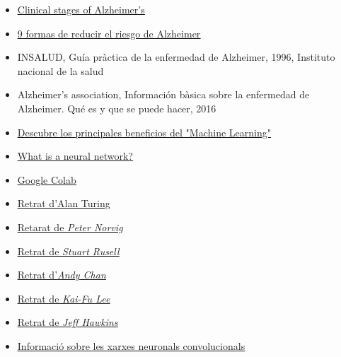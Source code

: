 \documentclass[a4paper,12pt]{article}
\begin{document}
\begin{itemize}
    \item \href{https://www.alzinfo.org/understand-alzheimers/clinical-stages-of-alzheimers/}{\underline{Clinical stages of Alzheimer's}}
    \item \href{https://www.ceafa.es/es/que-comunicamos/noticias/9-formas-de-reducir-el-riesgo-de-alzheimer}{\underline{9 formas de reducir el riesgo de Alzheimer}}
    \item INSALUD, Guía pràctica de la enfermedad de Alzheimer, 1996, Instituto nacional de la salud
    \item Alzheimer’s association, Información bàsica sobre la enfermedad de Alzheimer. Qué es y que se puede hacer, 2016
    \item \href{https://www.iberdrola.com/innovacion/machine-learning-aprendizaje-automatico}{\underline{Descubre los principales beneficios del "Machine Learning"}}
    \item \href{https://aws.amazon.com/es/what-is/neural-network/}{\underline{What is a neural network?}}
    \item \href{https://colab.research.google.com/}{\underline{Google Colab}}
    \item \href{https://upload.wikimedia.org/wikipedia/commons/a/a1/Alan_Turing_Aged_16.jpg}{\underline{Retrat d'Alan Turing}}
    \item \href{https://cs.berkeley.edu/sites/default/files/news_image/peter_norvig_speaking_at_university_of_california_berkeley_2013.jpg}{\underline{Retarat de \textit{Peter Norvig}}}
    \item \href{https://cs.berkeley.edu/sites/default/files/eecs_tout/russell-aqua.jpg}{\underline{Retrat de \textit{Stuart Rusell}}}
    \item \href{https://media.licdn.com/dms/image/C5603AQHgogiTxs2TZg/profile-displayphoto-shrink_800_800/0/1565701087600?e=2147483647&v=beta&t=p5ZjgearbT6mUGtGi2AEwDY07gaEWxmlGYDypO0HUVU}{\underline{Retrat d'\textit{Andy Chan}}}
    \item \href{https://upload.wikimedia.org/wikipedia/commons/0/0d/Capture_medium.jpg}{\underline{Retrat de \textit{Kai-Fu Lee}}}
    \item \href{https://m.media-amazon.com/images/W/IMAGERENDERING_521856-T1/images/S/amzn-author-media-prod/b2a43a485uokuohjp5l7peo9f0.jpg}{\underline{Retrat de \textit{Jeff Hawkins}}}
    \item \href{https://keepcoding.io/blog/redes-neuronales-convolucionales/#Que_son_las_Redes_Neuronales_Convolucionales}{\underline{Informació sobre les xarxes neuronals convolucionals}}

\end{itemize}
\end{document}
